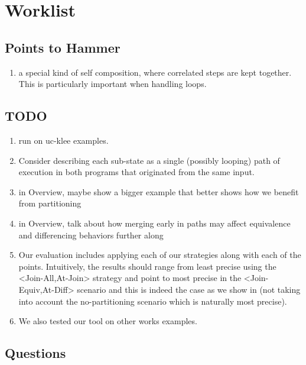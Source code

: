 \section{Worklist}

\subsection{Points to Hammer}

\begin{enumerate}
\item a special kind of self composition, where correlated steps are kept together. This is particularly important when handling loops.
\end{enumerate}

\subsection{TODO}
\begin{enumerate}
\item run on uc-klee examples.
\item Consider describing each sub-state as a single (possibly looping) path of execution in both programs that originated from the same input.
\item in Overview, maybe show a bigger example that better shows how we benefit from partitioning
\item in Overview, talk about how merging early in paths may affect equivalence and differencing behaviors further along
\item Our evaluation includes applying each of our strategies along with each of the points. Intuitively, the results should range from least precise using the <Join-All,At-Join> strategy and point to most precise in the <Join-Equiv,At-Diff> scenario and this is indeed the case as we show in  (not taking into account the no-partitioning scenario which is naturally most precise).
\item We also tested our tool on other works examples.
\end{enumerate}


\subsection{Questions}

